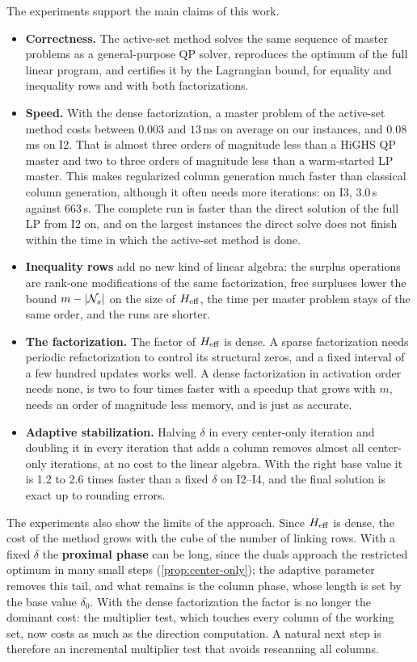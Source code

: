 The experiments support the main claims of this work.
\begin{itemize}
    \item \textbf{Correctness.} The active-set method solves the same sequence of master
          problems as a general-purpose QP solver, reproduces the optimum of the full linear
          program, and certifies it by the Lagrangian bound, for equality and inequality rows
          and with both factorizations.
    \item \textbf{Speed.} With the dense factorization, a master problem of the active-set
          method costs between $0.003$ and $13$\,ms on average on our instances, and $0.08$\,ms
          on I2. That is almost three orders of magnitude less than a HiGHS QP master and two
          to three orders of magnitude less than a warm-started LP master. This makes regularized column
          generation much faster than classical column generation, although it often needs
          more iterations: on I3, 3.0\,s against 663\,s. The complete run is faster than the
          direct solution of the full LP from I2 on, and on the largest instances the direct
          solve does not finish within the time in which the active-set method is done.
    \item \textbf{Inequality rows} add no new kind of linear algebra: the surplus operations
          are rank-one modifications of the same factorization, free surpluses lower the bound
          $m - |\mathcal{N}_s|$ on the size of $H_{\mathrm{eff}}$, the time per master problem stays of the same
          order, and the runs are shorter.
    \item \textbf{The factorization.} The factor of $H_{\mathrm{eff}}$ is dense. A sparse factorization
          needs periodic refactorization to control its structural zeros, and a fixed interval
          of a few hundred updates works well. A dense factorization in activation order
          needs none, is two to four times faster with a speedup that grows with $m$, needs an
          order of magnitude less memory, and is just as accurate.
    \item \textbf{Adaptive stabilization.} Halving $\delta$ in every center-only iteration and
          doubling it in every iteration that adds a column removes almost all center-only
          iterations, at no cost to the linear algebra. With the right base value it is 1.2 to
          2.6 times faster than a fixed $\delta$ on I2--I4, and the final solution is exact up
          to rounding errors.
\end{itemize}

The experiments also show the limits of the approach. Since $H_{\mathrm{eff}}$ is dense, the cost of the
method grows with the cube of the number of linking rows. With a fixed $\delta$ the
\textbf{proximal phase} can be long, since the duals approach the restricted optimum in many
small steps (\cref{prop:center-only}); the adaptive parameter removes this tail, and what
remains is the column phase, whose length is set by the base value $\delta_0$. With the dense
factorization the factor is no longer the dominant cost: the multiplier test, which touches
every column of the working set, now costs as much as the direction computation. A natural
next step is therefore an incremental multiplier test that avoids rescanning all columns.
